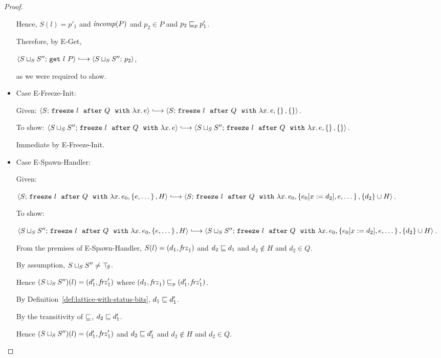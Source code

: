 \begin{proof}
\begin{itemize}
      Hence, $S(l) = p'_1$ and $\mathit{incomp}(P)$ and $p_2 \in P$ and $p_2
      \sqsubseteq_p p'_1$.

      Therefore, by {\sc E-Get},

      $\config{\lubstore{S}{S''}}{\getexp{l}{P}} \parstepsto
      \config{\lubstore{S}{S''}}{p_2}$,

      as we were required to show.

    \item Case {\sc E-Freeze-Init}:

      Given: $\config{S}{\freezeafter{l}{Q}{\lam{x}{e}}} \parstepsto
      \config{S}{\freezeafterfull{l}{Q}{\lam{x}{e}}{\setof{}}{\setof{}}}$.

      To show:
      $\config{\lubstore{S}{S''}}{\freezeafter{l}{Q}{\lam{x}{e}}}
      \parstepsto
      \config{\lubstore{S}{S''}}{\freezeafterfull{l}{Q}{\lam{x}{e}}{\setof{}}{\setof{}}}$.

      Immediate by {\sc E-Freeze-Init}.

    \item Case {\sc E-Spawn-Handler}:

      Given:

      $\config{S}{\freezeafterfull{l}{Q}{\lam{x}{e_0}}{\setof{e,
            \dots}}{H}} \parstepsto
      \config{S}{\freezeafterfull{l}{Q}{\lam{x}{e_0}}{\setof{\subst{e_0}{x}{d_2},
            e, \dots}} {\{d_2\}\cup H}}$.

      To show:

      $\config{\lubstore{S}{S''}}{\freezeafterfull{l}{Q}{\lam{x}{e_0}}{\setof{e,
            \dots}}{H}} \parstepsto
      \config{\lubstore{S}{S''}}{\freezeafterfull{l}{Q}{\lam{x}{e_0}}{\setof{\subst{e_0}{x}{d_2},
            e, \dots}} {\{d_2\}\cup H}}$.

      From the premises of {\sc E-Spawn-Handler}, $S(l) =
      (d_1, \mathit{frz}_1)$ and $d_2 \sqsubseteq d_1$ and $d_2 \notin
      H$ and $d_2 \in Q$.

      By assumption, $S \sqcup_{S} S'' \neq \top\hspace{-0.85mm}_{S}$.

      Hence $(S \sqcup_{S} S'')(l) = (d'_1, \mathit{frz}'_1)$ where
      $(d_1, \mathit{frz}_1) \sqsubseteq_p (d'_1, \mathit{frz}'_1)$.

      By Definition~\ref{def:lattice-with-status-bits}, $d_1 \sqsubseteq
      d'_1$.

      By the transitivity of $\sqsubseteq$, $d_2 \sqsubseteq d'_1$.

      Hence $(S \sqcup_{S} S'')(l) =
      (d'_1, \mathit{frz}'_1)$ and $d_2 \sqsubseteq d'_1$ and $d_2 \notin
      H$ and $d_2 \in Q$.


\end{itemize}
\end{proof}
